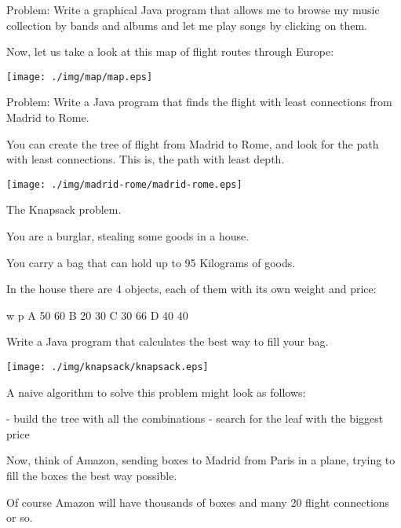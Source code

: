\documentclass[a4paper, 9pt]{extarticle}
\newcommand{\separator}{\begin{center}%
\noindent\makebox[\linewidth]{\rule{0.75\paperwidth}{0.4pt}}%
\end{center}}
\begin{document}
Problem: Write a graphical Java program that allows me to browse my music collection
by bands and albums and let me play songs by clicking on them.

\separator

Now, let us take a look at this map of flight routes through Europe:

\begin{center}
\texttt{[image: ./img/map/map.eps]}
\end{center}

Problem: Write a Java program that finds the flight with least connections from Madrid to Rome.

You can create the tree of flight from Madrid to Rome, and look for the path
with least connections. This is, the path with least depth.

\begin{center}
\texttt{[image: ./img/madrid-rome/madrid-rome.eps]}
\end{center}

\separator

The Knapsack problem.

You are a burglar, stealing some goods in a house.

You carry a bag that can hold up to 95 Kilograms of goods.

\newpage

In the house there are 4 objects, each of them with its own weight and price:

\begin{blackboard}
      w  p
  A  50 60
  B  20 30
  C  30 66
  D  40 40
\end{blackboard}

Write a Java program that calculates the best way to fill your bag.

\begin{center}
\texttt{[image: ./img/knapsack/knapsack.eps]}
\end{center}

A naive algorithm to solve this problem might look as follows:

\begin{blackboard}
  - build the tree with all the combinations
  - search for the leaf with the biggest price
\end{blackboard}

Now, think of Amazon, sending boxes to Madrid from Paris in a plane, trying to
fill the boxes the best way possible.

Of course Amazon will have thousands of boxes and many 20 flight connections or so.
\end{document}

